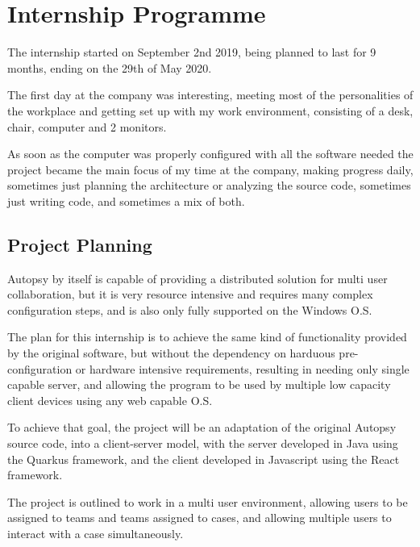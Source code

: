 

\chapter{Internship Programme}
\label{ch:development}

The internship started on September 2nd 2019, being planned to last for 9 months, ending on the 29th of May 2020.

The first day at the company was interesting, meeting most of the personalities of the workplace and getting set up with my work environment,
consisting of a desk, chair, computer and 2 monitors.

As soon as the computer was properly configured with all the software needed the project became the main focus of my time at the company,
making progress daily, sometimes just planning the architecture or analyzing the source code, sometimes just writing code, and sometimes a mix of both.

\section{Project Planning}

Autopsy by itself is capable of providing a distributed solution for multi user collaboration, but it is very resource intensive and requires many complex configuration steps,
and is also only fully supported on the Windows O.S.

The plan for this internship is to achieve the same kind of functionality provided by the original software, but without the dependency on harduous pre-configuration
or hardware intensive requirements, resulting in needing only single capable server, and allowing the program to be used by multiple low capacity client devices using 
any web capable O.S.

To achieve that goal, the project will be an adaptation of the original Autopsy source code, into a client-server model, with the server developed in Java using the Quarkus framework,
and the client developed in Javascript using the React framework.

The project is outlined to work in a multi user environment, allowing users to be assigned to teams and teams assigned to cases, and allowing multiple users to interact with
a case simultaneously.

